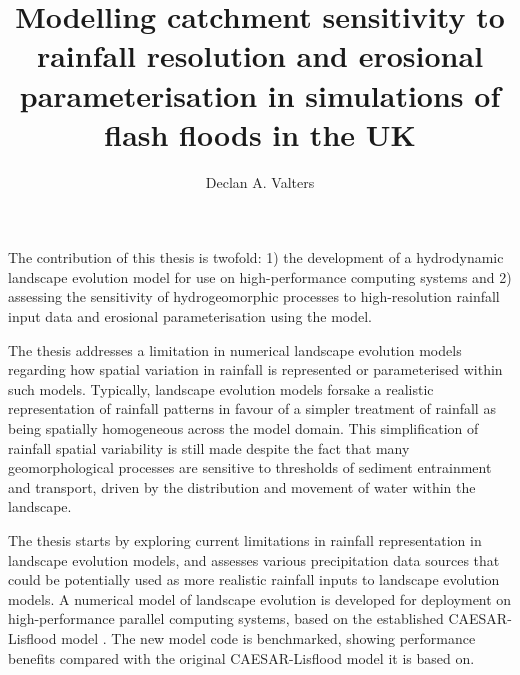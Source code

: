 
\title{Modelling catchment sensitivity to rainfall resolution and erosional parameterisation in simulations of flash floods in the UK}

\author{Declan A. Valters}
\def\wordcount{78241}




\beforeabstract
The contribution of this thesis is twofold: 1) the development of a hydrodynamic landscape evolution model for use on high-performance computing systems and 2) assessing the sensitivity of hydrogeomorphic processes to high-resolution rainfall input data and erosional parameterisation using the model.

The thesis addresses a limitation in numerical landscape evolution models regarding how spatial variation in rainfall is represented or parameterised within such models. Typically, landscape evolution models forsake a realistic representation of rainfall patterns in favour of a simpler treatment of rainfall as being spatially homogeneous across the model domain. This simplification of rainfall spatial variability is still made despite the fact that many geomorphological processes are sensitive to thresholds of sediment entrainment and transport, driven by the distribution and movement of water within the landscape. 

The thesis starts by exploring current limitations in rainfall representation in landscape evolution models, and assesses various precipitation data sources that could be potentially used as more realistic rainfall inputs to landscape evolution models. A numerical model of landscape evolution is developed for deployment on high-performance parallel computing systems, based on the established CAESAR-Lisflood model \citep{Coulthard2013}. The new model code is benchmarked, showing performance benefits compared with the original CAESAR-Lisflood model it is based on.

